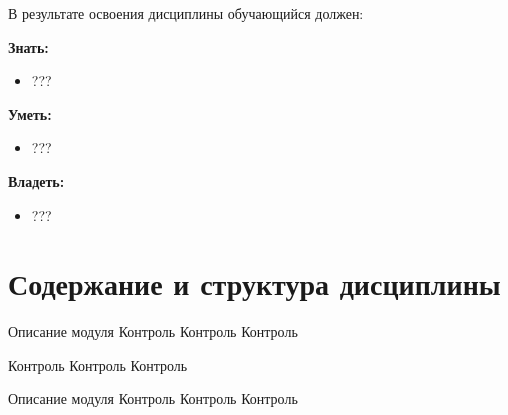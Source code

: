 В результате освоения дисциплины обучающийся должен:

\textbf{Знать:}
	\begin{itemize}
		\item ???
	\end{itemize}

\textbf{Уметь:}
	\begin{itemize}
		\item ???
	\end{itemize}

\textbf{Владеть:}
	\begin{itemize}
		\item ???
	\end{itemize}

\section{Содержание и структура дисциплины}
	







\myunit
	{Описание модуля}
	{Контроль Контроль Контроль}

\myunit
	{\lipsum[3-4]}
	{Контроль Контроль Контроль}

\myunit
	{Описание модуля}
	{Контроль Контроль Контроль}



\printhours

